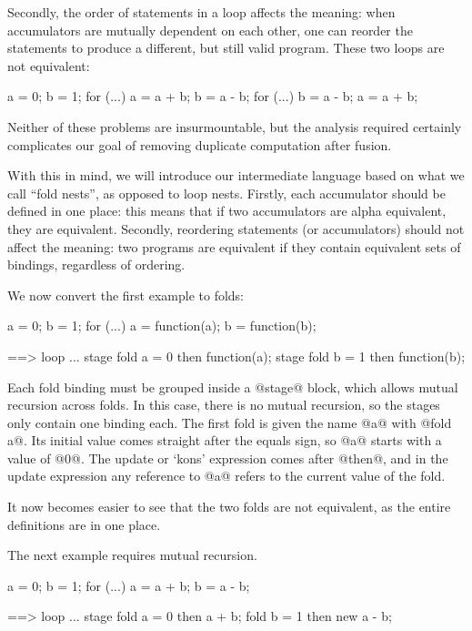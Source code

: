 Secondly, the order of statements in a loop affects the meaning: when accumulators are mutually dependent on each other, one can reorder the statements to produce a different, but still valid program.
These two loops are not equivalent:
\begin{code}
a = 0;
b = 1;
for (...) {
  a = a + b;
  b = a - b;
}
for (...) {
  b = a - b;
  a = a + b;
}
\end{code}

Neither of these problems are insurmountable, but the analysis required certainly complicates our goal of removing duplicate computation after fusion.

With this in mind, we will introduce our intermediate language based on what we call ``fold nests'', as opposed to loop nests.
Firstly, each accumulator should be defined in one place: this means that if two accumulators are alpha equivalent, they are equivalent.
Secondly, reordering statements (or accumulators) should not affect the meaning: two programs are equivalent if they contain equivalent sets of bindings, regardless of ordering.

We now convert the first example to folds:
\begin{code}
a = 0;
b = 1;
for (...) {
  a = function(a);
  b = function(b);
}

==>
loop ... {
  stage {
    fold a = 0
        then function(a);
  }
  stage {
    fold b = 1
        then function(b);
  }
}
\end{code}

Each fold binding must be grouped inside a @stage@ block, which allows mutual recursion across folds.
In this case, there is no mutual recursion, so the stages only contain one binding each.
The first fold is given the name @a@ with @fold a@.
Its initial value comes straight after the equals sign, so @a@ starts with a value of @0@.
The update or `kons' expression comes after @then@, and in the update expression any reference to @a@ refers to the current value of the fold.

It now becomes easier to see that the two folds are not equivalent, as the entire definitions are in one place.

The next example requires mutual recursion.
\begin{code}
a = 0;
b = 1;
for (...) {
  a = a + b;
  b = a - b;
}

==>
loop ... {
  stage {
    fold a = 0
        then a + b;
    fold b = 1
        then new a - b;
  }
}
\end{code}

